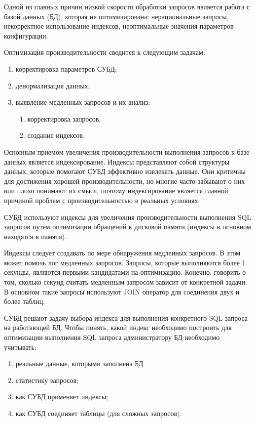 \Introduction

Одной из главных причин низкой скорости обработки запросов является работа с базой данных (БД), которая не оптимизирована: нерациональные запросы, некорректное использование индексов, неоптимальные значения параметров конфигурации. 

Оптимизация производительности сводится к следующим задачам: 
\begin{enumerate}
\item корректировка параметров СУБД;
\item денормализация данных;
\item выявление медленных запросов и их анализ:
    \begin{enumerate}
    \item корректировка запросов;
    \item создание индексов.
    \end{enumerate}
\end{enumerate}

Основным приемом увеличения производительности выполнения запросов к базе данных является индексирование. Индексы представляют собой структуры данных, которые помогают СУБД эффективно извлекать данные. Они критичны для достижения хорошей производительности, но многие часто забывают о них или плохо понимают их смысл, поэтому индексирование является главной причиной проблем с производительностью в реальных условиях. \cite{zaitsev}

СУБД используют индексы для увеличения производительности выполнения SQL запросов путем оптимизации обращений к дисковой памяти (индексы в основном находятся в памяти).

Индексы следует создавать по мере обнаружения медленных запросов. В этом может помочь лог медленных запросов. Запросы, которые выполняются более 1 секунды, являются первыми кандидатами на оптимизацию. \cite{ruhighload-mysql-indexes} Конечно, говорить о том, сколько секунд считать медленным запросом зависит от конкретной задачи. В основном такие запросы используют JOIN оператор для соединения двух и более таблиц.

СУБД решают задачу выбора индекса для выполнения конкретного SQL запроса на работающей БД. Чтобы понять, какой индекс необходимо построить для оптимизации выполнения SQL запроса администратору БД необходимо учитывать:
\begin{enumerate}
    \item реальные данные, которыми заполнена БД
    \item статистику запросов;
    \item как СУБД применяет индексы;
    \item как СУБД соединяет таблицы (для сложных запросов).
\end{enumerate}

